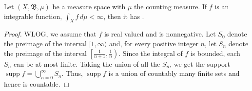 \documentclass[12pt]{article}
\def\supp{\operatorname{supp}}
\begin{document}

Let $(X,\mathfrak{B},\mu)$ be a measure space with $\mu$ the counting measure. If $f$ is an integrable function, $\displaystyle \int_X f\,d\mu<\infty$, then it has  .

\begin{proof}
WLOG, we assume that $f$ is real valued and is nonnegative. Let $S_0$ denote the preimage of the interval $[1,\infty)$ and, for every positive integer $n$, let $S_n$ denote the preimage of the interval $\left[\frac{1}{n+1},\frac{1}{n}\right)$. Since the integral of $f$ is bounded, each $S_n$ can be at most finite.  Taking the union of all the $S_n$, we get the support $\displaystyle \supp f = \bigcup_{n=0}^\infty S_n$.  Thus, $\supp f$ is a union of countably many finite sets and hence is countable.
\end{proof}
\end{document}
